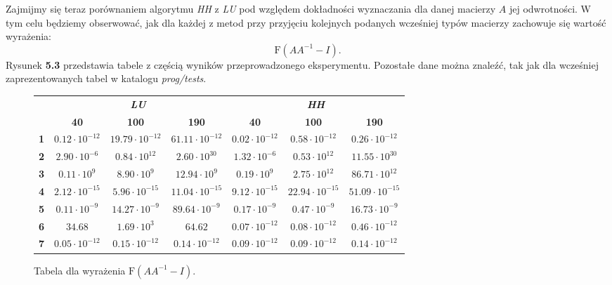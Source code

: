 Zajmijmy się teraz porównaniem algorytmu \textit{HH} z \textit{LU} pod względem
dokładności wyznaczania dla
danej macierzy $A$ jej odwrotności. W tym celu będziemy obserwować, jak dla
każdej z metod przy przyjęciu kolejnych
podanych wcześniej typów macierzy zachowuje się wartość wyrażenia:
$$\mathrm{F}(AA^{-1} - I).$$
Rysunek \textbf{5.3} przedstawia tabele z częścią wyników przeprowadzonego
eksperymentu. Pozostałe dane można znaleźć, tak jak dla wcześniej
zaprezentowanych tabel w katalogu \textit{prog/tests}.
\begin{figure}[h!tb]
\begin{center}
\begin{tabular}{|l||c|c|c||c|c|c|}
\hline
\multirow{2}{*}{} & \multicolumn{3}{|c||}{\textbf{\textit{LU}}} & \multicolumn{3}{|c|}{\textbf{\textit{HH}}}\\
\cline{2-7}
& \textbf{40} & \textbf{100} & \textbf{190} & \textbf{40} & \textbf{100} & \textbf{190} \\
\hline
\hline
\textbf{1} & $0.12 \cdot 10^{-12}$ & $19.79 \cdot 10^{-12}$ & $61.11 \cdot 10^{-12}$ & $0.02 \cdot 10^{-12}$ & $0.58 \cdot 10^{-12}$ & $0.26 \cdot 10^{-12}$ \\
\hline
\textbf{2} & $2.90 \cdot 10^{-6}$ & $0.84 \cdot 10^{12}$ & $2.60 \cdot 10^{30}$ & $1.32 \cdot 10^{-6}$ & $0.53 \cdot 10^{12} $ & $11.55 \cdot 10^{30}$ \\
\hline
\textbf{3} & $0.11 \cdot 10^{9}$ & $8.90\cdot 10^{9}$ & $12.94\cdot 10^{9}$ & $0.19\cdot 10^{9}$ & $2.75\cdot 10^{12}$ & $86.71\cdot 10^{12}$ \\
\hline
\textbf{4} & $2.12 \cdot 10^{-15}$ & $5.96 \cdot 10^{-15}$ & $11.04 \cdot 10^{-15}$ & $9.12 \cdot 10^{-15}$ & $22.94 \cdot 10^{-15}$ & $51.09 \cdot 10^{-15}$ \\
\hline
\textbf{5} & $0.11 \cdot 10^{-9}$ & $14.27 \cdot 10^{-9}$ & $89.64 \cdot 10^{-9}$ & $0.17 \cdot 10^{-9}$ & $0.47 \cdot 10^{-9}$ & $16.73 \cdot 10^{-9}$ \\
\hline
\textbf{6} & $34.68$ & $1.69 \cdot 10^{3}$ & $64.62$ & $0.07 \cdot 10^{-12}$ & $0.08 \cdot 10^{-12}$ & $0.46 \cdot 10^{-12}$ \\
\hline
\textbf{7} & $0.05 \cdot 10^{-12}$ & $0.15 \cdot 10^{-12}$ & $0.14 \cdot 10^{-12}$ & $0.09 \cdot 10^{-12}$ & $0.09 \cdot 10^{-12}$ & $0.14 \cdot 10^{-12}$ \\
\hline
\end{tabular}
\caption{Tabela dla wyrażenia $\mathrm{F}(AA^{-1}-I)$.} 
\end{center}
\end{figure}

